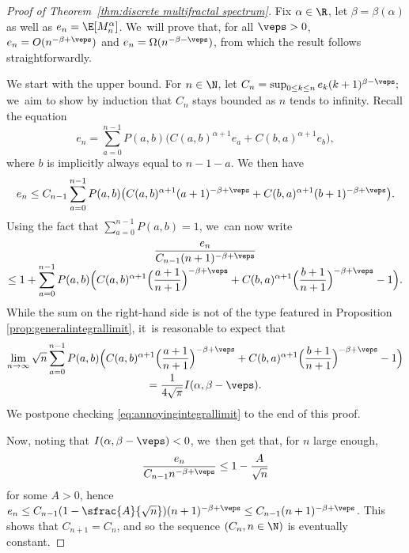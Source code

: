 \begin{proof}[Proof of Theorem~\ref{thm:discrete multifractal spectrum}]Fix $\alpha\in\R$, let $\beta=\beta(\alpha)$ as well as $e_n=\E[M_n^\alpha]$. We~will prove that, for all $\veps>0$, $e_n=O(n^{-\beta+\veps})$ and $e_n=\Omega(n^{-\beta-\veps})$, from which the result follows straightforwardly.

We start with the upper bound. For $n\in\N$, let $C_n=\sup_{0\leq k\leq n}e_k (k+1)^{\beta-\veps};$ we~aim to show by induction that $C_n$ stays bounded as $n$ tends to infinity. Recall the equation\vspace*{-3pt}
\[
e_n=\sum_{a=0}^{n-1}P(a,b)\bigl(C(a,b)^{\alpha+1}e_a+C(b,a)^{\alpha+1}e_b\bigr),
\]
where $b$ is implicitly always equal to $n-1-a$. We then have\vspace*{-3pt}
\[
e_n\leq C_{n-1} \sum_{a=0}^{n-1}P(a,b)\bigl(C(a,b)^{\alpha+1}(a+1)^{-\beta+\veps}+C(b,a)^{\alpha+1}(b+1)^{-\beta+\veps}\bigr).
\]
Using the fact that $\sum_{a=0}^{n-1} P(a,b)=1$, we~can now write\vspace*{-5pt}
\begin{multline*}
\frac{e_n}{C_{n-1}(n+1)^{-\beta+\veps}}\\[-5pt]
\leq 1+ \sum_{a=0}^{n-1}P(a,b)\Bigl(C(a,b)^{\alpha+1}\Bigl(\frac{a+1}{n+1}\Bigr)^{-\beta+\veps}+C(b,a)^{\alpha+1}\Bigl(\frac{b+1}{n+1}\Bigr)^{-\beta+\veps}-1\Bigr).
\end{multline*}
While the sum on the right-hand side is not of the type featured in Proposition \ref{prop:generalintegrallimit}, it~is reasonable to expect that\vspace*{-5pt}
\begin{multline}\label{eq:annoyingintegrallimit}
\lim_{n\to\infty} \sqrt{n}\sum_{a=0}^{n-1}P(a,b)\Bigl(C(a,b)^{\alpha+1}\Bigl(\frac{a+1}{n+1}\Bigr)^{-\beta+\veps}+C(b,a)^{\alpha+1}\Bigl(\frac{b+1}{n+1}\Bigr)^{-\beta+\veps}-1\Bigr)\\[-5pt]
=\frac1{4\sqrt{\pi}}I(\alpha,\beta-\veps).
\end{multline}
We postpone checking \eqref{eq:annoyingintegrallimit} to the end of this proof.

Now, noting that $I(\alpha,\beta-\veps)<0$, we~then get that, for $n$ large enough,\vspace*{-3pt}
\[
\frac{e_n}{C_{n-1}n^{-\beta+\veps}}\leq 1-\frac{A}{\sqrt{n}}
\]
for some $A>0$, hence
$e_n\leq C_{n-1}(1-\sfrac{A}{\sqrt{n}})(n+1)^{-\beta+\veps}\leq C_{n-1}(n+1)^{-\beta+\veps}$.
This shows that $C_{n+1}=C_n$, and so the sequence $(C_n,n\in\N)$ is eventually constant.


\end{proof}
